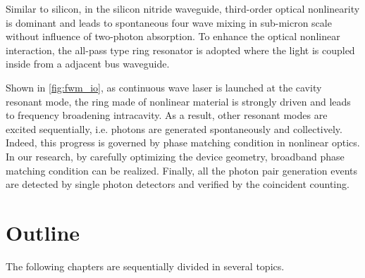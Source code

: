 Similar to silicon, in the silicon nitride waveguide, third-order optical nonlinearity is dominant and leads to spontaneous four wave mixing in sub-micron scale without influence of two-photon absorption.
To enhance the optical nonlinear interaction, the all-pass type ring resonator is adopted where the light is coupled inside from a adjacent bus waveguide. 

Shown in \autoref{fig:fwm_io},
as continuous wave laser is launched at the cavity resonant mode, the ring made of nonlinear material is strongly driven and leads to frequency broadening intracavity. As a result, other resonant modes are excited sequentially, i.e. photons are generated spontaneously and collectively. Indeed, this progress is governed by phase matching condition in nonlinear optics.
In our research, by carefully optimizing the device geometry, broadband phase matching condition can be realized. 
Finally, all the photon pair generation events are detected by single photon detectors and verified by the coincident counting. 

\begin{figure}
	\centering
	
	\label{fig:fwm_io}
\end{figure}

\section{Outline}

The following chapters are sequentially divided in several topics.

